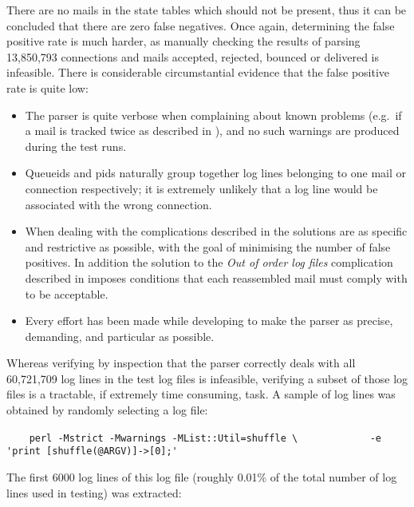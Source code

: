 There are no mails in the state tables which should not be present, thus it
can be concluded that there are zero false negatives.  Once again,
determining the false positive rate is much harder, as manually checking
the results of parsing 13,850,793 connections and mails accepted, rejected,
bounced or delivered is infeasible.  There is considerable circumstantial
evidence that the false positive rate is quite low:

\begin{itemize}

    \item The parser is quite verbose when complaining about known problems
        (e.g.\ if a mail is tracked twice as described in
        ), and no such warnings are
        produced during the test runs.

    \item Queueids and \glspl{pid} naturally group together log lines
        belonging to one mail or connection respectively; it is extremely
        unlikely that a log line would be associated with the wrong
        connection.

    \item When dealing with the complications described in
         the solutions are as specific and
        restrictive as possible, with the goal of minimising the number of
        false positives.  In addition the solution to the \textit{Out of
        order log files\/} complication described in  imposes conditions that each reassembled mail must
        comply with to be acceptable.

    \item Every effort has been made while developing to make the parser as
        precise, demanding, and particular as possible.

\end{itemize}

Whereas verifying by inspection that the parser correctly deals with all
60,721,709 log lines in the test log files is infeasible, verifying a
subset of those log files is a tractable, if extremely time consuming,
task.  A sample of log lines was obtained by randomly selecting a log file:

\verb!    perl -Mstrict -Mwarnings -MList::Util=shuffle \!\newline{}
\verb!            -e 'print [shuffle(@ARGV)]->[0];'!

The first 6000 log lines of this log file (roughly 0.01\% of the total
number of log lines used in testing) was extracted:

